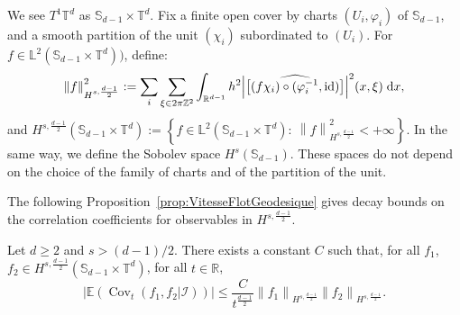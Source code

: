 \documentclass[10pt]{amsart}
\theoremstyle{definition}\newtheorem{defi}[theo]{Definition}\newtheorem{rema}[theo]{Remark}\newtheorem{exam}[theo]{Example}\newtheorem{exem}[theo]{Example}\newtheorem{nota}[theo]{Notation}
\DeclareMathOperator{\id}{id}
\DeclareMathOperator{\Cov}{Cov}
\newcommand{\Z}{\mathbb{Z}}
\newcommand{\R}{\mathbb{R}}
\newcommand{\Ebb}{\mathbb{E}}
\newcommand{\Lbb}{\mathbb{L}}
\newcommand{\Sbb}{\mathbb{S}}
\newcommand{\Tbb}{\mathbb{T}}
\newcommand{\Ical}{\mathcal{I}}
\newcommand{\dd}{\;{\rm d}}
\newcommand{\norm}[2]{\left\| #1 \right\|_{#2}}
\renewcommand*{\hat}[1]{\mathchoice{\widehat{#1}}{\widehat{#1}}{\oldhat{#1}}{\oldhat{#1}}}\let\oldforall\forall
\renewcommand*{\forall}{\mathrel{\oldforall}}
\begin{document}
We see $T^1 \Tbb^d$ as $\Sbb_{d-1} \times \Tbb^d$. Fix a finite open cover by charts $(U_i, \varphi_i)$ of $\Sbb_{d-1}$, and a smooth partition of the unit $(\chi_i)$ subordinated to $(U_i)$. For $f\in \Lbb^2 (\Sbb_{d-1} \times \Tbb^d))$, define:
\[
\norm{f}{H^{s,\frac{d-1}{2}}}^2 := \sum_i \sum_{\xi \in 2\pi\Z^2} \int_{\R^{d-1}} h^2 \Big|\hat{\big[(f \chi_i)\circ(\varphi_i^{-1},\id)\big]}\Big|^2 (x,\xi) \dd x,
\]
and $H^{s,\frac{d-1}{2}} (\Sbb_{d-1} \times \Tbb^d) := \left\{ f \in \Lbb^2 (\Sbb_{d-1} \times \Tbb^d): \ \norm{f}{H^{s,\frac{d-1}{2}}}^2 <+\infty \right\}$. In the same way, we define the Sobolev space $H^s (\Sbb_{d-1})$. These spaces do not depend on the choice of the family of charts and of the partition of the unit.


The following Proposition~\ref{prop:VitesseFlotGeodesique} gives decay bounds on the correlation coefficients for observables in $H^{s,\frac{d-1}{2}}$.



\begin{prop}\label{prop:VitesseFlotGeodesique}
Let $d \geq 2$ and $s > (d-1)/2$. There exists a constant $C$ such that, for all $f_1$, $f_2 \in H^{s,\frac{d-1}{2}} (\Sbb_{d-1} \times \Tbb^d)$, for all $t \in \R$,
\begin{equation}\label{eq:VitesseFlotGeodesique}
\big| \Ebb (\Cov_t (f_1, f_2|\Ical)) \big|
\leq \frac{C}{t^{\frac{d-1}{2}}} \norm{f_1}{H^{s,\frac{d-1}{2}}} \norm{f_2}{H^{s,\frac{d-1}{2}}}.
\end{equation}
\end{prop}
\end{document}
